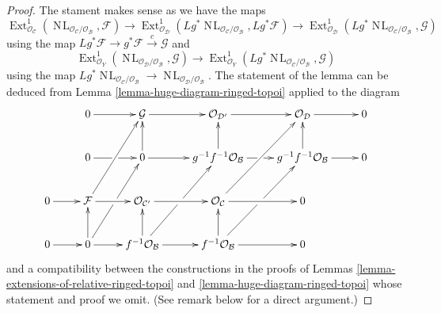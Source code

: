 \documentclass{stacks-project}
\theoremstyle{plain}
\theoremstyle{definition}
\theoremstyle{remark}
\numberwithin{equation}{subsection}
\def\Ext{\mathop{\mathrm{Ext}}\nolimits}
\def\NL{\mathop{N\!L}\nolimits}
\begin{document}
\begin{proof}
The stament makes sense as we have the maps
$$
\Ext^1_{\mathcal{O}_\mathcal{C}}(
\NL_{\mathcal{O}_\mathcal{C}/\mathcal{O}_\mathcal{B}}, \mathcal{F}) \to
\Ext^1_{\mathcal{O}_\mathcal{D}}(
Lg^*\NL_{\mathcal{O}_\mathcal{C}/\mathcal{O}_\mathcal{B}}, Lg^*\mathcal{F}) \to
\Ext^1_{\mathcal{O}_\mathcal{D}}
(Lg^*\NL_{\mathcal{O}_\mathcal{C}/\mathcal{O}_\mathcal{B}}, \mathcal{G})
$$
using the map $Lg^*\mathcal{F} \to g^*\mathcal{F} \xrightarrow{c} \mathcal{G}$
and
$$
\Ext^1_{\mathcal{O}_Y}(
\NL_{\mathcal{O}_\mathcal{D}/\mathcal{O}_\mathcal{B}}, \mathcal{G}) \to
\Ext^1_{\mathcal{O}_Y}(
Lg^*\NL_{\mathcal{O}_\mathcal{C}/\mathcal{O}_\mathcal{B}}, \mathcal{G})
$$
using the map $Lg^*\NL_{\mathcal{O}_\mathcal{C}/\mathcal{O}_\mathcal{B}} \to
\NL_{\mathcal{O}_\mathcal{D}/\mathcal{O}_\mathcal{B}}$.
The statement of the lemma can be deduced from
Lemma \ref{lemma-huge-diagram-ringed-topoi} applied to the diagram
$$
\xymatrix{
& 0 \ar[r] &
\mathcal{G} \ar[r] &
\mathcal{O}_{\mathcal{D}'} \ar[r] &
\mathcal{O}_\mathcal{D} \ar[r] & 0 \\
& 0 \ar[r]|\hole & 0 \ar[u] \ar[r] &
g^{-1}f^{-1}\mathcal{O}_\mathcal{B} \ar[u] \ar[r]|\hole &
g^{-1}f^{-1}\mathcal{O}_\mathcal{B} \ar[u] \ar[r] & 0 \\
0 \ar[r] &
\mathcal{F} \ar[ruu] \ar[r] &
\mathcal{O}_{\mathcal{C}'} \ar[r] &
\mathcal{O}_\mathcal{C} \ar[ruu] \ar[r] & 0 \\
0 \ar[r] & 0 \ar[ruu]|\hole \ar[u] \ar[r] &
f^{-1}\mathcal{O}_\mathcal{B} \ar[ruu]|\hole \ar[u] \ar[r] &
f^{-1}\mathcal{O}_\mathcal{B} \ar[ruu]|\hole \ar[u] \ar[r] & 0
}
$$
and a compatibility between the constructions in the proofs
of Lemmas \ref{lemma-extensions-of-relative-ringed-topoi} and
\ref{lemma-huge-diagram-ringed-topoi}
whose statement and proof we omit. (See remark below for a direct argument.)
\end{proof}
\end{document}
